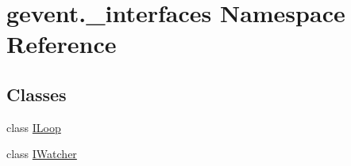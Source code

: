 \hypertarget{namespacegevent_1_1__interfaces}{}\section{gevent.\+\_\+interfaces Namespace Reference}
\label{namespacegevent_1_1__interfaces}
\subsection*{Classes}
\begin{DoxyCompactItemize}
\item 
class \hyperlink{classgevent_1_1__interfaces_1_1_i_loop}{I\+Loop}
\item 
class \hyperlink{classgevent_1_1__interfaces_1_1_i_watcher}{I\+Watcher}
\end{DoxyCompactItemize}
